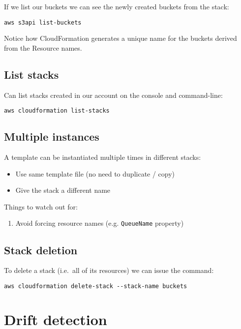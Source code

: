 \documentclass[slides]{pgnotes}
\begin{document}
If we list our buckets we can see the newly created buckets from the stack:

\begin{verbatim}
aws s3api list-buckets
\end{verbatim}

Notice how CloudFormation generates a unique name for the buckets derived from the Resource names.

\subsection{List stacks}
\label{sec:list-stacks}

Can list stacks created in our account on the console and command-line:

\begin{verbatim}
aws cloudformation list-stacks
\end{verbatim}


\subsection{Multiple instances}
\label{sec:multiple-instances}

A template can be instantiated multiple times in different stacks:
\begin{itemize}
\item Use same template file (no need to duplicate / copy)
\item Give the stack a different name
\end{itemize}
Things to watch out for:
\begin{enumerate}
\item Avoid forcing resource names (e.g. \texttt{QueueName} property)
\end{enumerate}


\subsection{Stack deletion}\label{stack-deletion}

To delete a stack (i.e.~all of its resources) we can issue the command:

\begin{verbatim}
aws cloudformation delete-stack --stack-name buckets
\end{verbatim}


\section{Drift detection}
\label{drift-detection}
\end{document}
